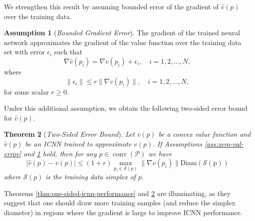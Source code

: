 \documentclass[10pt]{article} %
\theoremstyle{plain}
\newtheorem{theorem}{Theorem}[section]
\theoremstyle{definition}
\newtheorem{assumption}[theorem]{Assumption}
\theoremstyle{remark}
\begin{document}
We strengthen this result by assuming bounded error of the gradient of $\hat{v}(p)$ over the training data.
\vspace{0.25em}
\begin{assumption}[\textit{Bounded Gradient Error}] 
    The gradient of the trained neural network approximates the gradient of the value function over the training data set with error $\epsilon_i$ such that
    \[
    \nabla \hat{v}(p_i) = \nabla v(p_i) + \epsilon_i, \quad i=1,2, ...,N,
    \]
    where 
    \[
    \|\epsilon_i\| \leq r \| \nabla v(p_i)\|, \quad i = 1, 2, ..., N,
    \]
    for some scalar $r \geq 0$.
    \label{ass:bounded-grad-error}
\end{assumption}
Under this additional assumption, we obtain the following two-sided error bound for $\hat{v}(p)$.
\vspace{0.25em}
\begin{theorem}[\textit{Two-Sided Error Bound}] 
    Let $v(p)$ be a convex value function and $\hat{v}(p)$ be an ICNN trained to approximate $v(p)$. If Assumptions \ref{ass:zero-val-error} and \ref{ass:bounded-grad-error} hold, then for any $p \in \operatorname{conv}(\mathcal{P})$ we have
    \[
    |\hat{v}(p) - v(p)| \leq (1 + r) \max_{p_i \in \mathcal{S}(p)} \|\nabla v(p_i)\| \operatorname{Diam(\mathcal{S}(p))}
    \]
    where $\mathcal{S}(p)$ is the training data simplex of $p$.
    \label{thm:two-sided-icnn-performance}
\end{theorem}

Theorems \ref{thm:one-sided-icnn-performance} and \ref{thm:two-sided-icnn-performance} are illuminating, as they suggest that one should draw more training samples (and reduce the simplex diameter) in regions where the gradient is large to improve ICNN performance.
\end{document}
